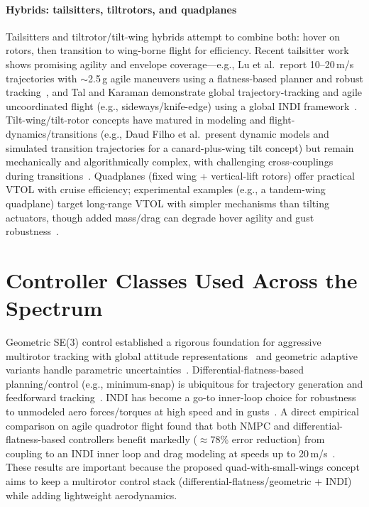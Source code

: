 \paragraph{Hybrids: tailsitters, tiltrotors, and quadplanes}
Tailsitters and tiltrotor/tilt-wing hybrids attempt to combine both: hover on rotors, then transition to wing-borne flight for efficiency.
Recent tailsitter work shows promising agility and envelope coverage---e.g., Lu et al.\ report 10--20\,m/s trajectories with $\sim$2.5\,g agile maneuvers using a flatness-based planner and robust tracking~\cite{Lu2022}, and Tal and Karaman demonstrate global trajectory-tracking and agile uncoordinated flight (e.g., sideways/knife-edge) using a global INDI framework~\cite{Tal2021Tailsitter,Tal2022Global}.
Tilt-wing/tilt-rotor concepts have matured in modeling and flight-dynamics/transitions (e.g., Daud Filho et al.\ present dynamic models and simulated transition trajectories for a canard-plus-wing tilt concept) but remain mechanically and algorithmically complex, with challenging cross-couplings during transitions~\cite{DaudFilho2024,Misra2022}.
Quadplanes (fixed wing + vertical-lift rotors) offer practical VTOL with cruise efficiency; experimental examples (e.g., a tandem-wing quadplane) target long-range VTOL with simpler mechanisms than tilting actuators, though added mass/drag can degrade hover agility and gust robustness~\cite{Okulski2022}.


\section{Controller Classes Used Across the Spectrum}

Geometric SE(3) control established a rigorous foundation for aggressive multirotor tracking with global attitude representations~\cite{Lee2010} and geometric adaptive variants handle parametric uncertainties~\cite{Goodarzi2015}.
Differential-flatness-based planning/control (e.g., minimum-snap) is ubiquitous for trajectory generation and feedforward tracking~\cite{Mellinger2011,Tal2018}.
INDI has become a go-to inner-loop choice for robustness to unmodeled aero forces/torques at high speed and in gusts~\cite{Sieberling2010,Smeur2017}.
A direct empirical comparison on agile quadrotor flight found that both NMPC and differential-flatness-based controllers benefit markedly ($\approx$78\% error reduction) from coupling to an INDI inner loop and drag modeling at speeds up to 20\,m/s~\cite{Sun2021}.
These results are important because the proposed quad-with-small-wings concept aims to keep a multirotor control stack (differential-flatness/geometric + INDI) while adding lightweight aerodynamics.


